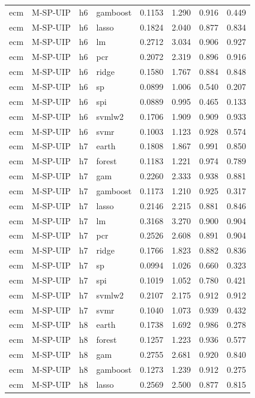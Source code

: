 \begin{ThreePartTable}
\begin{longtable}[t]{llclcccc}
ecm & M-SP-UIP & h6 & gamboost & 0.1153 & 1.290 & 0.916 & 0.449\\
ecm & M-SP-UIP & h6 & lasso & 0.1824 & 2.040 & 0.877 & 0.834\\
ecm & M-SP-UIP & h6 & lm & 0.2712 & 3.034 & 0.906 & 0.927\\
ecm & M-SP-UIP & h6 & pcr & 0.2072 & 2.319 & 0.896 & 0.916\\
ecm & M-SP-UIP & h6 & ridge & 0.1580 & 1.767 & 0.884 & 0.848\\
ecm & M-SP-UIP & h6 & sp & 0.0899 & 1.006 & 0.540 & 0.207\\
ecm & M-SP-UIP & h6 & spi & 0.0889 & 0.995 & 0.465 & 0.133\\
ecm & M-SP-UIP & h6 & svmlw2 & 0.1706 & 1.909 & 0.909 & 0.933\\
ecm & M-SP-UIP & h6 & svmr & 0.1003 & 1.123 & 0.928 & 0.574\\
\addlinespace
ecm & M-SP-UIP & h7 & earth & 0.1808 & 1.867 & 0.991 & 0.850\\
ecm & M-SP-UIP & h7 & forest & 0.1183 & 1.221 & 0.974 & 0.789\\
ecm & M-SP-UIP & h7 & gam & 0.2260 & 2.333 & 0.938 & 0.881\\
ecm & M-SP-UIP & h7 & gamboost & 0.1173 & 1.210 & 0.925 & 0.317\\
ecm & M-SP-UIP & h7 & lasso & 0.2146 & 2.215 & 0.881 & 0.846\\
ecm & M-SP-UIP & h7 & lm & 0.3168 & 3.270 & 0.900 & 0.904\\
ecm & M-SP-UIP & h7 & pcr & 0.2526 & 2.608 & 0.891 & 0.904\\
ecm & M-SP-UIP & h7 & ridge & 0.1766 & 1.823 & 0.882 & 0.836\\
ecm & M-SP-UIP & h7 & sp & 0.0994 & 1.026 & 0.660 & 0.323\\
ecm & M-SP-UIP & h7 & spi & 0.1019 & 1.052 & 0.780 & 0.421\\
ecm & M-SP-UIP & h7 & svmlw2 & 0.2107 & 2.175 & 0.912 & 0.912\\
ecm & M-SP-UIP & h7 & svmr & 0.1040 & 1.073 & 0.939 & 0.432\\
\addlinespace
ecm & M-SP-UIP & h8 & earth & 0.1738 & 1.692 & 0.986 & 0.278\\
ecm & M-SP-UIP & h8 & forest & 0.1257 & 1.223 & 0.936 & 0.577\\
ecm & M-SP-UIP & h8 & gam & 0.2755 & 2.681 & 0.920 & 0.840\\
ecm & M-SP-UIP & h8 & gamboost & 0.1273 & 1.239 & 0.912 & 0.275\\
ecm & M-SP-UIP & h8 & lasso & 0.2569 & 2.500 & 0.877 & 0.815\\

\end{longtable}
\end{ThreePartTable}
